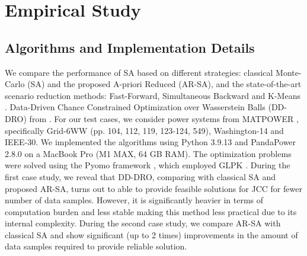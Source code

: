  

\section{Empirical Study}\label{sec:emp}
\subsection{Algorithms and Implementation Details}
We compare the performance of SA based on different strategies: classical Monte-Carlo (SA) and the proposed A-priori Reduced (AR-SA), and %
the state-of-the-art scenario reduction methods: Fast-Forward, Simultaneous Backward \cite{heitsch2003scenario, dupavcova2003scenario} and K-Means \cite{keutchayan2023problem}. 
Data-Driven Chance Constrained Optimization over Wasserstein Balls (DD-DRO) from \cite{chen2024data}. 
For our test cases, we consider power systems from MATPOWER \cite{zimmerman2010matpower}, specifically Grid-6WW \cite{wood2013power} (pp. 104, 112, 119, 123-124, 549), Washington-14 and IEEE-30.
%
We implemented the algorithms using Python 3.9.13 and PandaPower 2.8.0 \cite{pandapower.2018} on a MacBook Pro (M1 MAX, 64 GB RAM). The optimization problems were solved using the Pyomo framework \cite{hart2017pyomo}
, which employed GLPK \cite{Oki2012GLPKL}.%
During the first case study, we reveal that DD-DRO, comparing with classical SA and proposed AR-SA, turns out to able to provide feasible solutions for JCC for fewer number of data samples. However, it is significantly heavier in terms of computation burden and less stable making this method less practical due to its internal complexity.
During the second case study, we compare AR-SA with classical SA and show significant (up to 2 times) improvements in the amount of data samples required to provide reliable solution.

